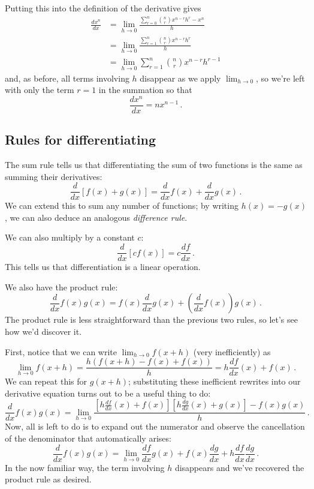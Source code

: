 \documentclass[12pt]{article}
\begin{document}
Putting this into the definition of the derivative gives
\begin{align*}
  \frac{dx^n}{dx}&=\lim_{h\to 0} \frac{\sum_{r=0}^n \binom{n}{r}x^{n-r}h^r - x^n}{h}\\
  &=\lim_{h\to 0} \frac{\sum_{r=1}^n \binom{n}{r}x^{n-r}h^{r}}{h} \\
  &=\lim_{h\to 0}\sum_{r=1}^n \binom{n}{r}x^{n-r}h^{r-1} 
\end{align*}
and, as before, all terms involving $h$ disappear as we apply $\lim_{h\to 0}$, so we're left with only the term $r=1$ in the summation so that
\begin{equation}
    \frac{dx^n}{dx} = nx^{n-1}\,.
\end{equation}

\subsection*{Rules for differentiating}
The sum rule tells us that differentiating the sum of two functions is the same as summing their derivatives:
\begin{equation}
    \frac{d}{dx}\left[f(x) + g(x)\right] = \frac{d}{dx}f(x) + \frac{d}{dx}g(x)\,.
\end{equation}
We can extend this to sum any number of functions; by writing $h(x) = -g(x)$, we can also deduce an analogous \emph{difference rule}.

We can also multiply by a constant $c$:
\begin{equation}
  \frac{d}{dx}[cf(x)]=c\frac{df}{dx}\,.
\end{equation}
This tells us that differentiation is a linear operation.

We also have the product rule:
\begin{equation}
  \frac{d}{dx}f(x)g(x)=f(x)\frac{d}{dx}g(x) +  \left(\frac{d}{dx}f(x)\right)g(x)\,.
\end{equation}
The product rule is less straightforward than the previous two rules, so let's see how we'd discover it.

First, notice that we can write $\lim_{h\to 0}f(x+h)$ (very inefficiently) as 
\begin{equation}
\lim_{h\to 0}f(x+h) = \frac{h \left(f(x+h) - f(x) + f(x)\right)}{h} =  h\frac{df}{dx}(x)+f(x)\,.
\end{equation}
We can repeat this for $g(x+h)$; substituting these inefficient rewrites into our derivative equation turns out to be a useful thing to do:
\begin{equation}
  \frac{d}{dx}f(x)g(x)=\lim_{h\to 0}\frac{\left[h\frac{df}{dx}(x)+f(x)\right]\left[h\frac{dg}{dx}(x)+g(x)\right] - f(x) g(x)  
  }{h}\,.  
\end{equation}
Now, all is left to do is to expand out the numerator and observe the cancellation of the denominator that automatically arises:
\begin{equation}
  \frac{d}{dx}f(x)g(x)=\lim_{h\to 0}   \frac{df}{dx}g(x)+f(x)\frac{dg}{dx}+h\frac{df}{dx}\frac{dg}{dx}\,.
\end{equation}
In the now familiar way, the term involving $h$ disappears and we've recovered the product rule as desired. 
\end{document}
